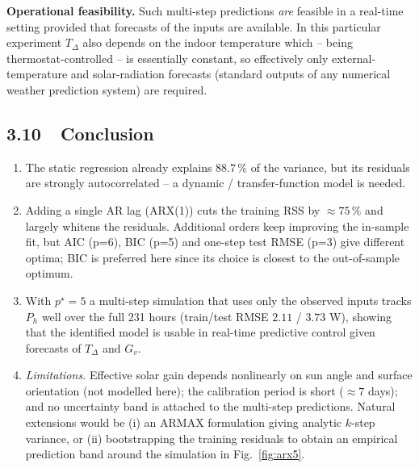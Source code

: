 \documentclass[11pt,a4paper]{article}
\begin{document}
\textbf{Operational feasibility.} Such multi-step predictions \emph{are}
feasible in a real-time setting provided that forecasts of the inputs are
available. In this particular experiment $T_\Delta$ also depends on the
indoor temperature which -- being thermostat-controlled -- is essentially
constant, so effectively only external-temperature and solar-radiation
forecasts (standard outputs of any numerical weather prediction system) are
required.

\subsection*{3.10~~Conclusion}
\begin{enumerate}[leftmargin=*,itemsep=2pt,topsep=2pt]
\item The static regression already explains $88.7\,\%$ of the variance, but
      its residuals are strongly autocorrelated -- a dynamic /
      transfer-function model is needed.
\item Adding a single AR lag (ARX(1)) cuts the training RSS by $\approx 75\,\%$
      and largely whitens the residuals. Additional orders keep improving
      the in-sample fit, but AIC (p=6), BIC (p=5) and one-step test RMSE
      (p=3) give different optima; BIC is preferred here since its choice
      is closest to the out-of-sample optimum.
\item With $p^{\star}=5$ a multi-step simulation that uses only the observed
      inputs tracks $P_h$ well over the full 231 hours (train/test RMSE
      $2.11$ / $3.73$ W), showing that the identified model is usable in
      real-time predictive control given forecasts of $T_\Delta$ and $G_v$.
\item \emph{Limitations.} Effective solar gain depends nonlinearly on sun
      angle and surface orientation (not modelled here); the calibration
      period is short ($\approx 7$ days); and no uncertainty band is
      attached to the multi-step predictions. Natural extensions would be
      (i) an ARMAX formulation giving analytic $k$-step variance, or
      (ii) bootstrapping the training residuals to obtain an empirical
      prediction band around the simulation in Fig.~\ref{fig:arx5}.
\end{enumerate}
\end{document}
